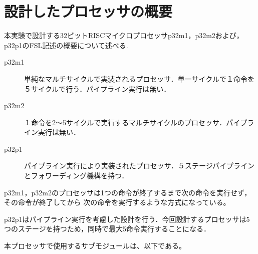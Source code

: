 \documentclass{jarticle}[11pt]
\begin{document}

\section{設計したプロセッサの概要}\label{sec:設計したプロセッサの概要}
本実験で設計する32ビットRISCマイクロプロセッサp32m1，p32m2および，p32p1のFSL記述の概要について述べる.

\begin{description}
  \item [p32m1]単純なマルチサイクルで実装されるプロセッサ．単一サイクルで１命令を５サイクルで行う．パイプライン実行は無い．
  \item [p32m2]１命令を2～5サイクルで実行するマルチサイクルのプロセッサ．パイプライン実行は無い．
  \item [p32p1]パイプライン実行により実装されたプロセッサ．５ステージパイプラインとフォワーディング機構を持つ．
\end{description}

p32m1，p32m2のプロセッサは1つの命令が終了するまで次の命令を実行せず，その命令が終了してから
次の命令を実行するような方式になっている。

p32p1はパイプライン実行を考慮した設計を行う．今回設計するプロセッサは5つのステージを持つため，同時で最大5命令実行することになる．

本プロセッサで使用するサブモジュールは、以下である。

\end{document}
